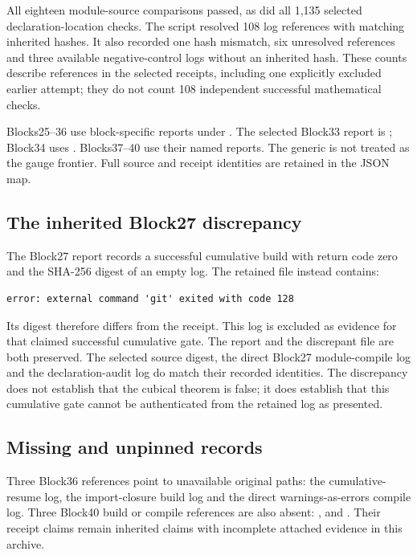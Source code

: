 All eighteen module-source comparisons passed, as did all 1,135 selected declaration-location checks. The script resolved 108 log references with matching inherited hashes. It also recorded one hash mismatch, six unresolved references and three available negative-control logs without an inherited hash. These counts describe references in the selected receipts, including one explicitly excluded earlier attempt; they do not count 108 independent successful mathematical checks.

Blocks25--36 use block-specific reports under . The selected Block33 report is ; Block34 uses . Blocks37--40 use their named  reports. The generic  is not treated as the gauge frontier. Full source and receipt identities are retained in the JSON map.

\subsection{The inherited Block27 discrepancy}

The Block27 report records a successful cumulative build with return code zero and the SHA-256 digest of an empty log. The retained file  instead contains:
\begin{lstlisting}
error: external command 'git' exited with code 128
\end{lstlisting}
Its digest therefore differs from the receipt. This log is excluded as evidence for that claimed successful cumulative gate. The report and the discrepant file are both preserved. The selected source digest, the direct Block27 module-compile log and the declaration-audit log do match their recorded identities. The discrepancy does not establish that the cubical theorem is false; it does establish that this cumulative gate cannot be authenticated from the retained log as presented.

\subsection{Missing and unpinned records}

Three Block36 references point to unavailable original paths: the cumulative-resume log, the import-closure build log and the direct warnings-as-errors compile log. Three Block40 build or compile references are also absent: ,  and . Their receipt claims remain inherited claims with incomplete attached evidence in this archive.

